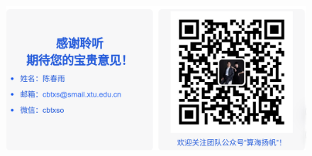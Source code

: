 \documentclass[notheorems,serif]{beamer}
\begin{document}
\begin{frame}
\begin{figure}[htbp]
\centering
\includegraphics[width=1\textwidth]{../figures/suanhai.png}
\end{figure}
\end{frame}
\end{document}
